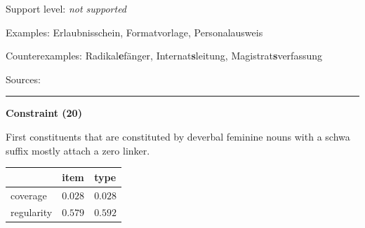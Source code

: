 \vspace{-1.35em}

\noindent
Support level: \textit{not supported}

\vspace{0.3em}

\noindent
Examples: Erlaubnis{\zeroLinker}schein, Format{\zeroLinker}vorlage, Personal{\zeroLinker}ausweis

\noindent
Counterexamples: Radikal\textbf{e}fänger, Internat\textbf{s}leitung, Magistrat\textbf{s}verfassung

\vspace{0.3em}

\noindent
Sources: \citet[83, 107]{ortner_mueller-bollhagen_1991}

\vspace{0.35em}
\hrule




\vspace{0.4em}

\begin{center}
\textbf{Constraint (20)}
\end{center}

\noindent
First constituents that are constituted by deverbal feminine nouns with a schwa suffix mostly attach a zero linker.
\vspace{0.5em}


\vspace{-0.25em}

\begin{table}[!ht]
\begin{center}
\setlength{\extrarowheight}{1pt}
\begin{tabularx}{\columnwidth}{|X|X|X|}
\hline
 & item & type \\
\hline
 coverage & $0.028$ & $0.028$ \\
\hline
 regularity & $0.579$ & $0.592$ \\
\hline
\end{tabularx}
\end{center}
\end{table}

